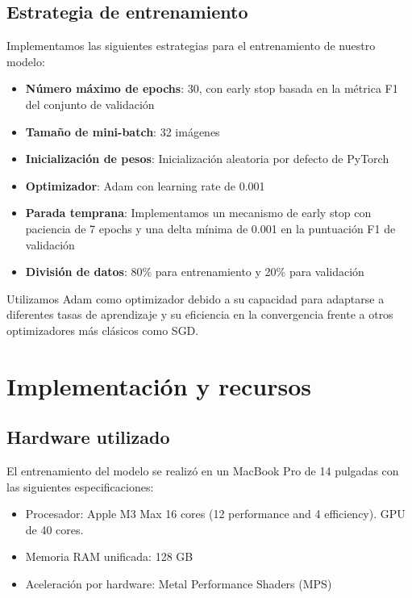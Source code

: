 \documentclass[es]{uc3mreport}
\begin{document}
\begin{report}
    \subsection{Estrategia de entrenamiento}
    
    Implementamos las siguientes estrategias para el entrenamiento de nuestro modelo:
    
    \begin{itemize}
        \item \textbf{Número máximo de epochs}: 30, con early stop basada en la métrica F1 del conjunto de validación
        \item \textbf{Tamaño de mini-batch}: 32 imágenes
        \item \textbf{Inicialización de pesos}: Inicialización aleatoria por defecto de PyTorch
        \item \textbf{Optimizador}: Adam con learning rate de 0.001
        \item \textbf{Parada temprana}: Implementamos un mecanismo de early stop con paciencia de 7 epochs y una delta mínima de 0.001 en la puntuación F1 de validación
        \item \textbf{División de datos}: 80\% para entrenamiento y 20\% para validación
    \end{itemize}

    Utilizamos Adam como optimizador debido a su capacidad para adaptarse a diferentes tasas de aprendizaje y su eficiencia en la convergencia frente a otros optimizadores más clásicos como SGD.
    
    \section{Implementación y recursos}
    
    \subsection{Hardware utilizado}
    
    El entrenamiento del modelo se realizó en un MacBook Pro de 14 pulgadas con las siguientes especificaciones:
    
    \begin{itemize}
        \item Procesador: Apple M3 Max 16 cores (12 performance and 4 efficiency). GPU de 40 cores.
        \item Memoria RAM unificada: 128 GB
        \item Aceleración por hardware: Metal Performance Shaders (MPS)
    \end{itemize}
    

\end{report}
\end{document}
